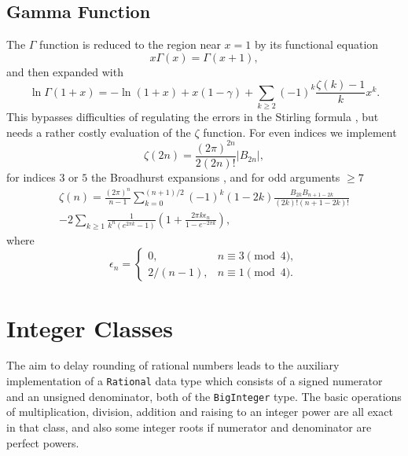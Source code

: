 \documentclass[showpacs,showkeys,amssymb,aps,twocolumn]{revtex4-1}
\begin{document}
\subsection{Gamma Function}
The $\Gamma$ function is reduced to the region near $x=1$ by its
functional equation
\begin{equation}
x\Gamma(x)=\Gamma(x+1),
\end{equation}
and then expanded with \cite[(6.1.33)]{AS}
\begin{equation}
\ln \Gamma(1+x) = -\ln(1+x)+x(1-\gamma) +\sum_{k\ge 2}(-1)^k\frac{\zeta(k)-1}{k}x^k
.
\end{equation}
This bypasses difficulties of regulating the errors in the Stirling formula
\cite{SpiraMathComp25,WrenchMCom22,GordonJACM7}, but needs a rather costly evaluation of the $\zeta$ function.
For even indices we implement \cite[(23.2.16)]{AS}
\begin{equation}
\zeta(2n)= \frac{(2\pi)^{2n}}{2(2n)!}|B_{2n}|,
\label{eq.zetaB}
\end{equation}
for indices $3$ or $5$ the Broadhurst expansions \cite{BroadhurstArxiv98},
and for odd arguments $\ge 7$ \cite{CohenExpMath1,VepstasRJ27}
\begin{eqnarray}
\zeta(n) = \frac{(2\pi)^n}{n-1}
\sum_{k=0}^{(n+1)/2}
(-1)^k(1-2k)\frac{B_{2k}B_{n+1-2k}}{(2k)!(n+1-2k)!}
\nonumber \\
-2\sum_{k\ge 1}
\frac{1}{k^n(e^{2\pi k}-1)}
\left(1+\frac{2\pi k\epsilon_n}{1-e^{-2\pi k}}\right),
\end{eqnarray}
where
\begin{equation}
\epsilon_n = \left\{
\begin{array}{ll}
0, & n\equiv 3 \pmod 4,\\
2/(n-1), & n\equiv 1 \pmod 4.
\end{array}
\right.
\end{equation}

\section{Integer Classes}

The aim to delay rounding of rational numbers leads to the auxiliary
implementation of a \texttt{Rational} data type which consists of a
signed numerator and an unsigned denominator, both of the \texttt{BigInteger} type.
The basic operations of multiplication, division, addition and raising
to an integer power are all exact in that class, and also some 
integer roots if numerator and denominator are perfect powers.
\end{document}

